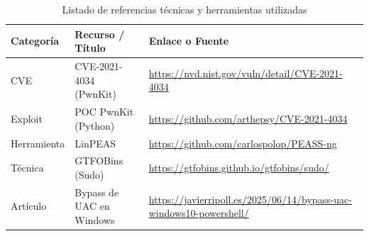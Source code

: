\documentclass[a4paper]{article}
\begin{document}
\begin{table}[H]
    \centering
    \begin{tabularx}{\textwidth}{l l X} 
        \toprule
        \textbf{Categoría} & 
        \textbf{Recurso / Título} & 
        \textbf{Enlace o Fuente} \\

        \midrule
        CVE & 
        CVE-2021-4034 (PwnKit) & 
        \url{https://nvd.nist.gov/vuln/detail/CVE-2021-4034} \\

        Exploit & 
        POC PwnKit (Python) & 
        \url{https://github.com/arthepsy/CVE-2021-4034} \\

        Herramienta & 
        LinPEAS & 
        \url{https://github.com/carlospolop/PEASS-ng} \\

        Técnica & 
        GTFOBins (Sudo) & 
        \url{https://gtfobins.github.io/gtfobins/sudo/} \\

        Artículo & 
        Bypass de UAC en Windows & 
        \url{https://javierripoll.es/2025/06/14/bypass-uac-windows10-powershell/} \\
        \bottomrule

    \end{tabularx}
    \caption{Listado de referencias técnicas y herramientas utilizadas}
\end{table}
\end{document}
